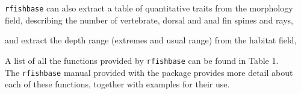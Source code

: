\begin{Shaded}
\begin{Highlighting}[]
\NormalTok{)}
\end{Highlighting}
\end{Shaded}
\texttt{rfishbase} can also extract a table of quantitative traits from
the morphology field, describing the number of vertebrate, dorsal and
anal fin spines and rays,

\begin{Shaded}
\begin{Highlighting}[]
\end{Highlighting}
\end{Shaded}
and extract the depth range (extremes and usual range) from the habitat
field,

\begin{Shaded}
\begin{Highlighting}[]
\end{Highlighting}
\end{Shaded}
A list of all the functions provided by \texttt{rfishbase} can be found
in Table 1.\\The \texttt{rfishbase} manual provided with the package
provides more detail about each of these functions, together with
examples for their use.

